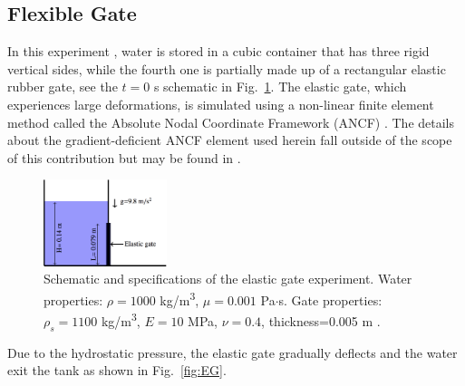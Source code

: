 \subsection{Flexible Gate}
In this experiment \cite{Antoci2007,yang2012}, water is stored in a cubic container that has three rigid vertical sides, while the fourth one is partially made up of a rectangular elastic rubber gate, see the $t=0$ \si{s} schematic in Fig.~\ref{fig:Elastic_Gate_Schematic_fsi}. The elastic gate, which experiences large deformations, is simulated using a non-linear finite element method called the Absolute Nodal Coordinate Framework (ANCF) \cite{shabana2013}. The details about the gradient-deficient ANCF element used herein fall outside of the scope of this contribution but may be found in \cite{Yamashita2015continuum}. 
\begin{figure}[H]
	\begin{center}
		\includegraphics[width=0.32\textwidth]{images/FSI_Comparison/Elastic_Gate_Schematic.png}
	\end{center}
	\caption{Schematic and specifications of the elastic gate experiment. Water properties: $\rho=1000$ \si{kg/m^3}, $\mu=0.001$ \si{Pa}$\cdot$\si{s}. Gate properties: $\rho_s=1100$ \si{kg/m^3}, $E=10$ \si{MPa}, $\nu=0.4$, thickness=0.005 \si{m} \cite{Antoci2007}. }
	\label{fig:Elastic_Gate_Schematic_fsi}
\end{figure}
Due to the hydrostatic pressure, the elastic gate gradually deflects and the water exit the tank as shown in Fig.~\ref{fig:EG}.
